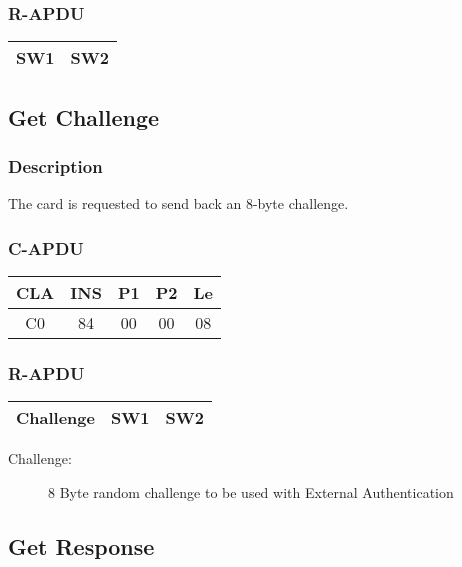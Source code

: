 \documentclass[a4paper,oneside]{article}
\begin{document}
\subsubsection*{R-APDU}

\begin{tabular}{|c|c|} \hline
SW1 & SW2 \\ \hline
\end{tabular}


\subsection{Get Challenge}

\subsubsection*{Description}

The card is requested to send back an 8-byte challenge.

\subsubsection*{C-APDU}

\begin{tabular}{|c|c|c|c|c|} \hline
CLA & INS & P1 & P2 & Le \\ \hline \hline
C0 & 84 & 00 & 00 & 08 \\ \hline
\end{tabular}

\subsubsection*{R-APDU}

\begin{tabular}{|c|c|c|} \hline
Challenge & SW1 & SW2 \\ \hline
\end{tabular}

\begin{description}
\item[Challenge:] 8 Byte random challenge to be used with External
     Authentication
\end{description}


\subsection{Get Response}
\end{document}
